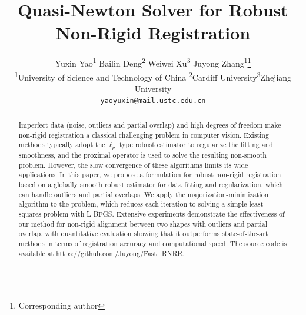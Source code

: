 \documentclass[10pt,twocolumn,letterpaper]{article}
\begin{document}
\title{Quasi-Newton Solver for Robust Non-Rigid Registration}

\author{Yuxin Yao\textsuperscript{1} \quad Bailin Deng\textsuperscript{2} \quad Weiwei Xu\textsuperscript{3} \quad Juyong Zhang\textsuperscript{1}\thanks{Corresponding author}\\
	\textsuperscript{1}University of Science and Technology of China \quad \textsuperscript{2}Cardiff University\quad \textsuperscript{3}Zhejiang University\\
	{\tt\small yaoyuxin@mail.ustc.edu.cn}  
}

\maketitle

\begin{abstract}
Imperfect data (noise, outliers and partial overlap) and high degrees of freedom make non-rigid registration a classical challenging problem in computer vision. Existing methods typically adopt the $\ell_{p}$ type robust estimator to regularize the fitting and smoothness, and the proximal operator is used to solve the resulting non-smooth problem. However, the slow convergence of these algorithms limits its wide applications. In this paper, we propose a formulation for robust non-rigid registration based on a globally smooth robust estimator for data fitting and regularization, which can handle outliers and partial overlaps. We apply the majorization-minimization algorithm to the problem, which reduces each iteration to solving a simple least-squares problem with L-BFGS. Extensive experiments demonstrate the effectiveness of our method for non-rigid alignment between two shapes with outliers and partial overlap, with quantitative evaluation showing that it outperforms state-of-the-art methods in terms of registration accuracy and computational speed. The source code is available at \url{https://github.com/Juyong/Fast_RNRR}.
\end{abstract}
\end{document}
